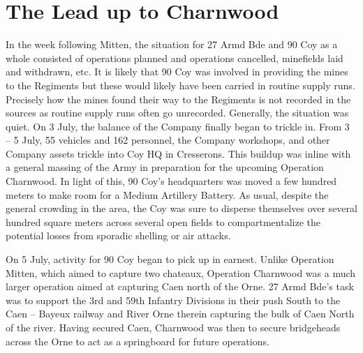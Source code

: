 \documentclass[noraggedright]{turabian-researchpaper}
\begin{document}



\section{The Lead up to Charnwood}

In the week following Mitten, the situation for 27 Armd Bde and 90 Coy as a 
whole consisted of operations planned and operations cancelled, minefields 
laid and withdrawn, etc. %
It is likely that 90 Coy was involved in providing the mines to the Regiments 
but these would likely have been carried in routine supply runs. Precisely 
how the mines found their way to the Regiments is not recorded in the sources
as routine supply runs often go unrecorded.  Generally, the situation was 
quiet.  On 3 July, the balance of the Company finally began to trickle in.  
From 3 -- 5 July, 55 vehicles and 162 personnel, the Company workshops, and 
other Company assets trickle into Coy HQ in Cresserons.  This buildup was 
inline with a general massing of the Army in preparation for the upcoming 
Operation Charnwood.  In light of this, 90 Coy's headquarters was moved a few 
hundred meters to make room for a Medium Artillery Battery.  As usual, 
despite the general crowding in the area, the Coy was sure to disperse 
themselves over several hundred square meters across several open fields to 
compartmentalize the potential losses from sporadic shelling or air 
attacks.\autocite[1 -- 5 July 1944]{90wd}  

On 5 July, activity for 90 Coy began to pick up in earnest.  Unlike Operation 
Mitten, which aimed to capture two chateaux,  Operation Charnwood was a much 
larger operation aimed at capturing Caen north of the Orne.  27 Armd Bde's
task was to support the 3rd and 59th Infantry Divisions in their push 
South to the Caen -- Bayeux railway and River Orne therein capturing the bulk 
of Caen North of the river.  Having secured Caen, Charnwood was then to secure 
bridgeheads across the Orne to act as a springboard for future 
operations.\autocite [Operation Charnwood, 27th Armoured Brigade Operation 
Order No 2 (See appendix to July diary following papers pertaining to 
Goodwood)]{27wd} 
\end{document}
